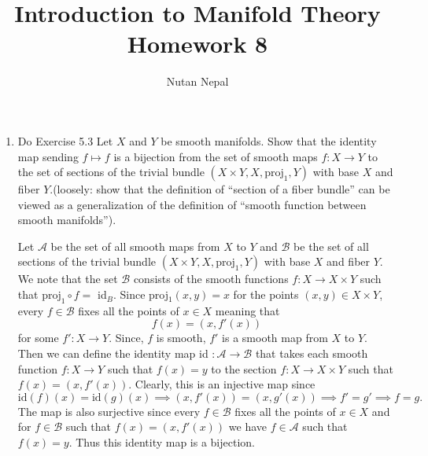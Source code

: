 \documentclass[12pt]{article}
\title{\textbf{Introduction to Manifold Theory} \\
\large Homework 8
}
\author{Nutan Nepal}
\begin{document}
\maketitle
\makebox[\linewidth]{\rule{200mm}{1pt}}
\vspace{1mm}

\begin{enumerate}

\item Do Exercise 5.3 Let $X$ and $Y$ be smooth manifolds.
Show that the identity
map sending $f\longmapsto f$ is a bijection from the set
of smooth maps $f : X\to Y$
to the set of sections of the trivial bundle
$(X\times Y, X, \text{proj}_1, Y)$ with base $X$
and fiber $Y$.(loosely: show that the definition
of “section of a fiber bundle” can
be viewed as a generalization of the definition of
“smooth function between smooth manifolds”).

\begin{mybox}

    Let $\mathcal{A}$ be the set of all smooth maps
    from $X$ to $Y$ and $\mathcal{B}$ be the set of
    all sections of the trivial bundle
    $(X\times Y, X, \text{proj}_1, Y)$
    with base $X$ and fiber $Y$. We note that the set
    $\mathcal{B}$ consists of the smooth functions
    $f:X\to X\times Y$ such that $\text{proj}_1
    \circ f =$ id$_B$. Since proj$_1(x,y)=x$ for the
    points $(x,y)\in X\times Y$, every $f\in\mathcal{B}$
    fixes all the points of $x\in X$ meaning that
    $$f(x)=(x,f'(x))$$ for some $f':X\to Y$. Since,
    $f$ is smooth, $f'$ is a smooth map from $X$ to
    $Y$. Then we can define the identity map
    id $:\mathcal{A}\to\mathcal{B}$ that takes each
    smooth function $f:X\to Y$ such that $f(x)=y$
    to the section $f:X\to X\times Y$ such that
    $f(x)=(x,f'(x))$. Clearly, this is an injective
    map since
    $$\text{id}(f)(x)=\text{id}(g)(x)\implies
    (x,f'(x))=(x,g'(x))\implies f'=g'\implies f=g.$$
    The map is also surjective since every
    $f\in\mathcal{B}$ fixes all the points of $x\in X$
    and for $f\in\mathcal{B}$ such that $f(x)=(x,f'(x))$
    we have $f\in\mathcal{A}$ such that $f(x)=y$. Thus
    this identity map is a bijection.
\end{mybox}

\end{enumerate}
\end{document}
